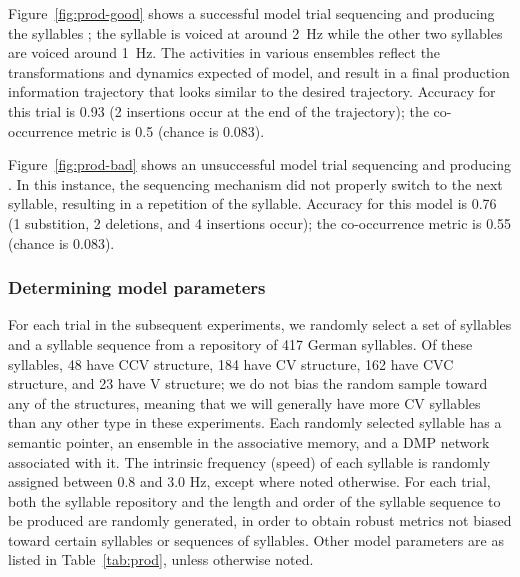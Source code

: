 Figure~\ref{fig:prod-good} shows
a successful model trial
sequencing and producing the syllables
;
the \ipa{[ti]} syllable is voiced
at around 2~Hz while the other
two syllables are voiced around 1~Hz.
The activities in various ensembles
reflect the transformations
and dynamics expected of model,
and result in a final
production information trajectory
that looks similar
to the desired trajectory.
Accuracy for this trial is 0.93
(2 insertions occur at the end of the trajectory);
the co-occurrence metric is 0.5
(chance is 0.083).



Figure~\ref{fig:prod-bad}
shows an unsuccessful model trial
sequencing and producing
.
In this instance,
the sequencing mechanism did not properly
switch to the next syllable,
resulting in a repetition of the
\ipa{[ti]} syllable.
Accuracy for this model is 0.76
(1 substition, 2 deletions, and 4 insertions occur);
the co-occurrence metric is 0.55
(chance is 0.083).

\subsubsection{Determining model parameters}

For each trial in the subsequent experiments,
we randomly select a set of syllables
and a syllable sequence
from a repository of 417 German syllables.
Of these syllables,
48 have CCV structure,
184 have CV structure,
162 have CVC structure,
and 23 have V structure;
we do not bias the random sample
toward any of the structures,
meaning that we will generally
have more CV syllables
than any other type in these experiments.
Each randomly selected syllable
has a semantic pointer,
an ensemble in the associative memory,
and a DMP network associated with it.
The intrinsic frequency (speed)
of each syllable is randomly assigned
between 0.8 and 3.0 Hz,
except where noted otherwise.
For each trial,
both the syllable repository
and the length and order
of the syllable sequence
to be produced are randomly generated,
in order to obtain robust metrics
not biased toward certain syllables
or sequences of syllables.
Other model parameters are as listed in
Table~\ref{tab:prod},
unless otherwise noted.

